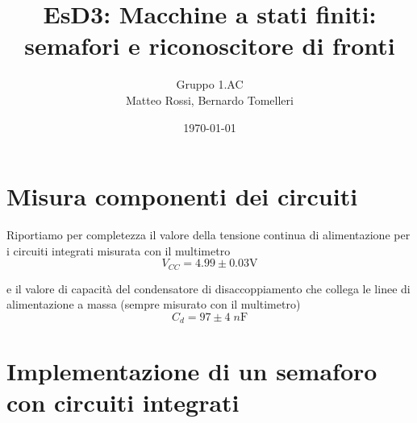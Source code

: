 \documentclass[10pt, a4paper, italian]{article}
\author{Gruppo 1.AC \\ Matteo Rossi, Bernardo Tomelleri}
\title{EsD3: Macchine a stati finiti: semafori e riconoscitore di fronti}
\begin{document}
\date{\today}
\maketitle

\section{Misura componenti dei circuiti}
Riportiamo per completezza il valore della tensione continua di
alimentazione per i circuiti integrati misurata con il multimetro
\[
V_{CC} = 4.99 \pm 0.03 \si{\V}
\]

e il valore di capacità del condensatore di disaccoppiamento che collega le
linee di alimentazione a massa (sempre misurato con il multimetro)
\[
C_d = 97 \pm 4 \; \si{n\F}
\]

\section{Implementazione di un semaforo con circuiti integrati}\label{sec: dlatch}
\end{document}
